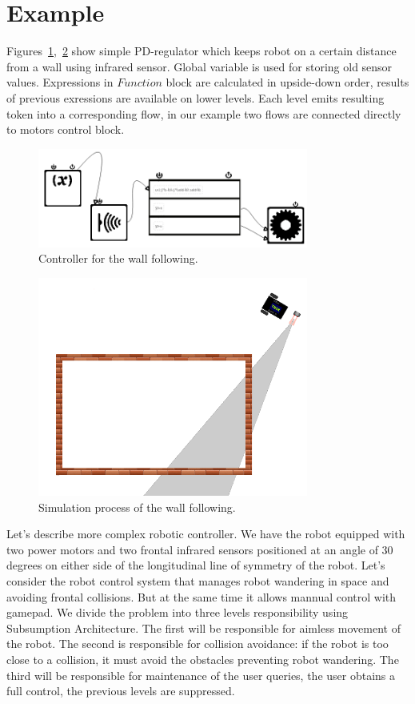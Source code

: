 \documentclass[conference,compsoc]{IEEEtran}
\begin{document}
\section{Example}
\label{sec:example}
Figures~\ref{image:boxC},~\ref{image:box} show simple PD-regulator which keeps robot on a certain distance from a wall using infrared sensor. Global variable is used for storing old sensor values. Expressions in $Function$ block are calculated in upside-down order, results of previous exressions are available on lower levels. Each level emits resulting token into a corresponding flow, in our example two flows are connected directly to motors control block.


\begin{figure}[ht]
	\centering
	\includegraphics[width=3.5in]{alongBoxCode.png}
	\caption{Controller for the wall following.}
	\label{image:boxC}
\end{figure}

\begin{figure}[ht]
	\centering
	\includegraphics[width=3.5in]{alongBoxModel.png}
	\caption{Simulation process of the wall following.}
	\label{image:box}
\end{figure}

Let's describe more complex robotic controller. We have the robot equipped with two power motors and two frontal infrared sensors positioned at an angle of 30 degrees on either side of the longitudinal line of symmetry of the robot. Let's consider the robot control system that manages robot wandering in space and avoiding frontal collisions. But at the same time it allows mannual control with gamepad. We divide the problem into three levels responsibility using Subsumption Architecture. The first will be responsible for aimless movement of the robot. The second is responsible for collision avoidance: if the robot is too close to a collision, it must avoid the obstacles preventing robot wandering. The third will be responsible for maintenance of the user queries, the user obtains a full control, the previous levels are suppressed.
\end{document}
